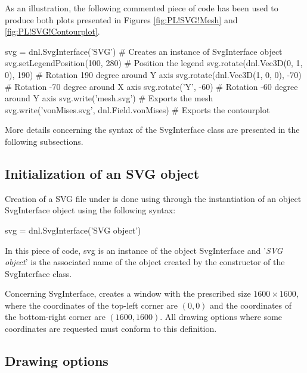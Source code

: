 As an illustration, the following commented piece of code has been used to produce both plots presented in Figures \ref{fig:PL!SVG!Mesh} and \ref{fig:PL!SVG!Contourplot}.
\begin{PythonListing}
svg = dnl.SvgInterface('SVG')       # Creates an instance of SvgInterface object
svg.setLegendPosition(100, 280)     # Position the legend
svg.rotate(dnl.Vec3D(0, 1, 0), 190) # Rotation 190 degree around Y axis
svg.rotate(dnl.Vec3D(1, 0, 0), -70) # Rotation -70 degree around X axis
svg.rotate('Y', -60)                # Rotation -60 degree around Y axis
svg.write('mesh.svg')               # Exports the mesh
svg.write('vonMises.svg', dnl.Field.vonMises) # Exports the contourplot
\end{PythonListing}

More details concerning the syntax of the SvgInterface class are presented in the following subsections.

\subsection{Initialization of an SVG object}
Creation of a SVG file under \DynELA is done using through the instantiation of an object \textsf{SvgInterface} object using the following syntax:
\begin{PythonListing}
svg = dnl.SvgInterface('SVG object')
\end{PythonListing}
In this piece of code, \textsf{svg} is an instance of the object \textsf{SvgInterface} and '\emph{SVG object}' is the associated name of the object created by the constructor of the \textsf{SvgInterface} class.

Concerning \textsf{SvgInterface}, \DynELA creates a window with the prescribed size $1600\times1600$, where the coordinates of the top-left corner are $(0, 0)$ and the coordinates of the bottom-right corner are $(1600, 1600)$. All drawing options where some coordinates are requested must conform to this definition.

\subsection{Drawing options}

